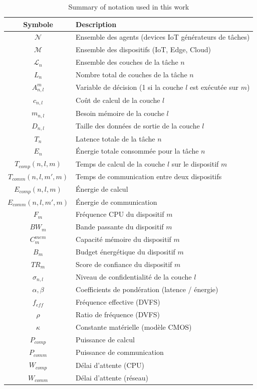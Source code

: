 \documentclass[12pt,a4paper]{report}
\begin{document}
\begin{table}[H]
\centering
\renewcommand{\arraystretch}{1.3}
\begin{tabular}{|c|l|}
\hline
\textbf{Symbole} & \textbf{Description} \\
\hline
$\mathcal{N}$ & Ensemble des agents (devices IoT générateurs de tâches) \\
$\mathcal{M}$ & Ensemble des dispositifs (IoT, Edge, Cloud) \\
$\mathcal{L}_n$ & Ensemble des couches de la tâche $n$ \\
$L_n$ & Nombre total de couches de la tâche $n$ \\
$A_{n,l}^m$ & Variable de décision (1 si la couche $l$ est exécutée sur $m$) \\
$c_{n,l}$ & Coût de calcul de la couche $l$ \\
$m_{n,l}$ & Besoin mémoire de la couche $l$ \\
$D_{n,l}$ & Taille des données de sortie de la couche $l$ \\
$T_n$ & Latence totale de la tâche $n$ \\
$E_n$ & Énergie totale consommée pour la tâche $n$ \\
$T_{comp}(n,l,m)$ & Temps de calcul de la couche $l$ sur le dispositif $m$ \\
$T_{comm}(n,l,m',m)$ & Temps de communication entre deux dispositifs \\
$E_{comp}(n,l,m)$ & Énergie de calcul \\
$E_{comm}(n,l,m',m)$ & Énergie de communication \\
$F_m$ & Fréquence CPU du dispositif $m$ \\
$BW_m$ & Bande passante du dispositif $m$ \\
$C^{mem}_m$ & Capacité mémoire du dispositif $m$ \\
$B_m$ & Budget énergétique du dispositif $m$ \\
$TR_m$ & Score de confiance du dispositif $m$ \\
$\sigma_{n,l}$ & Niveau de confidentialité de la couche $l$ \\
$\alpha, \beta$ & Coefficients de pondération (latence / énergie) \\
$f_{eff}$ & Fréquence effective (DVFS) \\
$\rho$ & Ratio de fréquence (DVFS) \\
$\kappa$ & Constante matérielle (modèle CMOS) \\
$P_{comp}$ & Puissance de calcul \\
$P_{comm}$ & Puissance de communication \\
$W_{comp}$ & Délai d’attente (CPU) \\
$W_{comm}$ & Délai d’attente (réseau) \\
\hline
\end{tabular}
\caption{Summary of notation used in this work}
\label{tab:notation}
\end{table}
\end{document}
